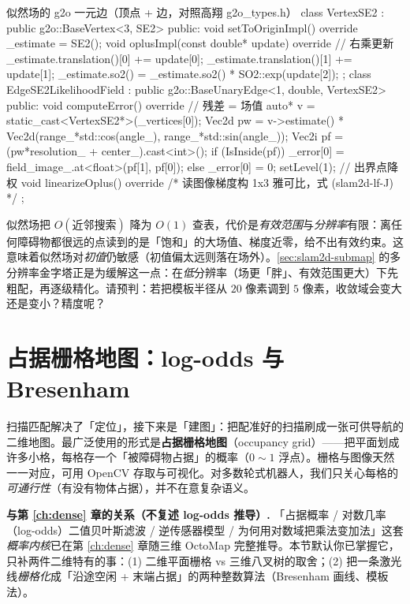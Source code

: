 \begin{codebox}[C++]{似然场的 g2o 一元边（顶点 + 边，对照高翔 g2o\_types.h）}
class VertexSE2 : public g2o::BaseVertex<3, SE2> {
public:
  void setToOriginImpl() override { _estimate = SE2(); }
  void oplusImpl(const double* update) override {       // 右乘更新
    _estimate.translation()[0] += update[0];
    _estimate.translation()[1] += update[1];
    _estimate.so2() = _estimate.so2() * SO2::exp(update[2]);
  }
};
class EdgeSE2LikelihoodField : public g2o::BaseUnaryEdge<1, double, VertexSE2> {
public:
  void computeError() override {                          // 残差 = 场值
    auto* v = static_cast<VertexSE2*>(_vertices[0]);
    Vec2d pw = v->estimate() * Vec2d(range_*std::cos(angle_), range_*std::sin(angle_));
    Vec2i pf = (pw*resolution_ + center_).cast<int>();
    if (IsInside(pf)) _error[0] = field_image_.at<float>(pf[1], pf[0]);
    else { _error[0] = 0; setLevel(1); }                  // 出界点降权
  }
  void linearizeOplus() override { /* 读图像梯度构 1x3 雅可比，式 (slam2d-lf-J) */ }
};
\end{codebox}

\begin{practice}
似然场把 $O(\text{近邻搜索})$ 降为 $O(1)$ 查表，代价是\emph{有效范围}与\emph{分辨率}有限：离任何障碍物都很远的点读到的是「饱和」的大场值、梯度近零，给不出有效约束。这意味着似然场对\emph{初值}仍敏感（初值偏太远则落在场外）。\cref{sec:slam2d-submap} 的多分辨率金字塔正是为缓解这一点：在\emph{低}分辨率（场更「胖」、有效范围更大）下先粗配，再逐级精化。请预判：若把模板半径从 $20$ 像素调到 $5$ 像素，收敛域会变大还是变小？精度呢？
\end{practice}

\section{占据栅格地图：log-odds 与 Bresenham}
\label{sec:slam2d-grid}

扫描匹配解决了「定位」，接下来是「建图」：把配准好的扫描刷成一张可供导航的二维地图。最广泛使用的形式是\textbf{占据栅格地图}（occupancy grid）——把平面划成许多小格，每格存一个「被障碍物占据」的概率（$0\!\sim\!1$ 浮点）。栅格与图像天然一一对应，可用 OpenCV 存取与可视化。对多数轮式机器人，我们只关心每格的\emph{可通行性}（有没有物体占据），并不在意复杂语义。

\begin{note}
\textbf{与第 \cref{ch:dense} 章的关系（不复述 log-odds 推导）.}\;
「占据概率 / 对数几率（log-odds）二值贝叶斯滤波 / 逆传感器模型 / 为何用对数域把乘法变加法」这套\emph{概率内核}已在第 \cref{ch:dense} 章随三维 OctoMap 完整推导。本节默认你已掌握它，只补两件二维特有的事：(1) 二维平面栅格 vs 三维八叉树的取舍；(2) 把一条激光线\emph{栅格化}成「沿途空闲 + 末端占据」的两种整数算法（Bresenham 画线、模板法）。
\end{note}

